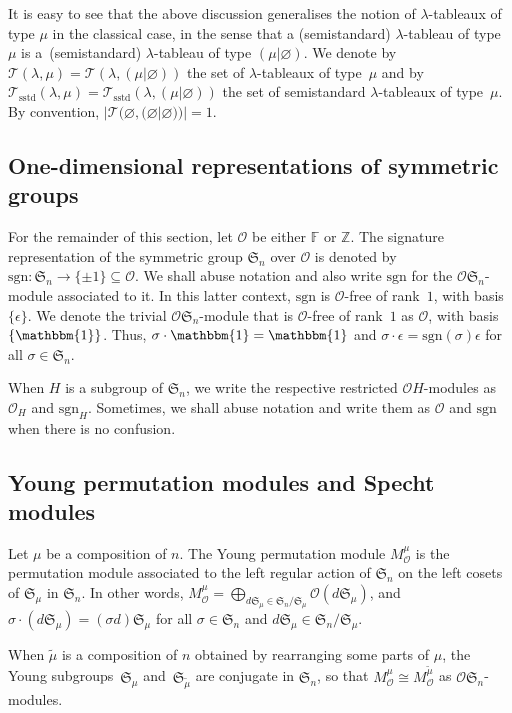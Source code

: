 \documentclass[pdftex]{sigma}
\newcommand{\TT}{\mathscr{T}}
\newcommand{\TTS}{\mathscr{T}_\mathrm{sstd}}
\newcommand{\sgn}{\mathrm{sgn}}
\newcommand{\sym}[1]{\mathfrak{S}_{#1}}
\newcommand{\F}{\mathbb{F}}
\newcommand{\bb}[1]{\mathbbm{{#1}}}
\renewcommand{\O}{\mathcal{O}}
\newcommand{\Z}{\mathbb{Z}}
\begin{document}
It is easy to see that the above discussion generalises the notion of $\lambda$-tableaux of type $\mu$ in the classical case, in the sense that a (semistandard) $\lambda$-tableau of type~$\mu$ is a~(semistandard) $\lambda$-tableau of type $(\mu|\varnothing)$. We denote by $\TT(\lambda,\mu)=\TT(\lambda,(\mu|\varnothing))$ the set of $\lambda$-tableaux of type~$\mu$ and by $\TTS(\lambda,\mu)=\TTS(\lambda,(\mu|\varnothing))$ the set of semistandard $\lambda$-tableaux of type~$\mu$. By convention, $|\TT(\varnothing,(\varnothing|\varnothing))|=1$.


\subsection{One-dimensional representations of symmetric groups}

For the remainder of this section, let $\O$ be either $\F$ or $\Z$. The signature representation of the symmetric group $\sym{n}$ over $\O$ is denoted by $\sgn \colon \sym{n} \to \{ \pm 1 \} \subseteq \O$. We shall abuse notation and also write $\sgn$ for the $\O\sym{n}$-module associated to it. In this latter context, $\sgn$ is $\O$-free of rank~$1$, with basis $\{\epsilon\}$. We denote the trivial $\O\sym{n}$-module that is $\O$-free of rank~$1$ as $\O$, with basis~$\{\bb{1}\}$. Thus, $\sigma \cdot \bb{1} = \bb{1}$ and $\sigma \cdot \epsilon = \sgn(\sigma) \epsilon$ for all $\sigma \in \sym{n}$.

When $H$ is a subgroup of $\sym{n}$, we write the respective restricted $\O H$-modules as $\O_{H}$ and $\sgn_H$. Sometimes, we shall abuse notation and write them as $\O$ and $\sgn$ when there is no confusion.

\subsection{Young permutation modules and Specht modules}

Let $\mu$ be a composition of $n$. The Young permutation module $M^{\mu}_{\O}$ is the permutation module associated to the left regular action of $\sym{n}$ on the left cosets of $\sym{\mu}$ in $\sym{n}$. In other words, $M^{\mu}_{\O} = \bigoplus_{d \sym{\mu} \in \sym{n}/\sym{\mu}} \O (d\sym{\mu})$, and $\sigma \cdot (d \sym{\mu}) = (\sigma d )\sym{\mu}$ for all $\sigma \in \sym{n}$ and $d\sym{\mu} \in \sym{n}/\sym{\mu}$.

When $\tilde{\mu}$ is a composition of $n$ obtained by rearranging some parts of $\mu$, the Young sub\-groups~$\sym{\mu}$ and~$\sym{\tilde{\mu}}$ are conjugate in $\sym{n}$, so that $M^{\mu}_{\O} \cong M^{\tilde{\mu}}_{\O}$ as $\O\sym{n}$-modules.
\end{document}
